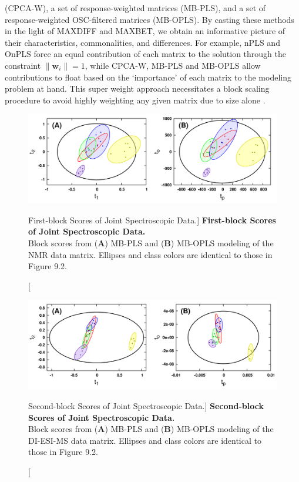 \begin{doublespace}
(CPCA-W), a set of response-weighted matrices (MB-PLS), and a set of
response-weighted OSC-filtered matrices (MB-OPLS). By casting these methods
in the light of MAXDIFF and MAXBET, we obtain an informative picture of their
characteristics, commonalities, and differences. For example, nPLS and OnPLS
force an equal contribution of each matrix to the solution through the
constraint $\|\mathbf{w}_i\|=1$, while CPCA-W, MB-PLS and MB-OPLS allow
contributions to float based on the `importance' of each matrix to the
modeling problem at hand. This super weight approach necessitates a block
scaling procedure to avoid highly weighting any given matrix due to size
alone \cite{smilde:jchemo2003,westerhuis:jchemo1998}.
\end{doublespace}

\begin{figure}[ht!]
\includegraphics[width=6.5in]{figs/mbopls/04-blkscores-1.png}
\caption
      [First-block Scores of Joint Spectroscopic Data.]{
  {\bf First-block Scores of Joint Spectroscopic Data.}
  \\
  Block scores from ({\bf A}) MB-PLS and ({\bf B}) MB-OPLS modeling of the
  \hnmr{} NMR data matrix. Ellipses and class colors are identical to those
  in Figure 9.2.
}
\label{figure.9.4}
\end{figure}

\begin{figure}[ht!]
\includegraphics[width=6.5in]{figs/mbopls/05-blkscores-2.png}
\caption
      [Second-block Scores of Joint Spectroscopic Data.]{
  {\bf Second-block Scores of Joint Spectroscopic Data.}
  \\
  Block scores from ({\bf A}) MB-PLS and ({\bf B}) MB-OPLS modeling of the
  DI-ESI-MS data matrix. Ellipses and class colors are identical to those
  in Figure 9.2.
}
\label{figure.9.5}
\end{figure}

